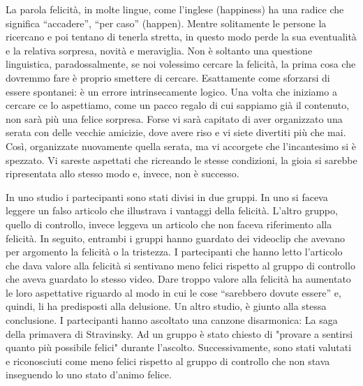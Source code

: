\documentclass[12pt]{book} %
\begin{document}
La parola felicità, in molte lingue, come l'inglese (happiness) ha una radice che significa
“accadere”, “per caso” (happen). Mentre solitamente le persone la ricercano e poi tentano di tenerla stretta, in questo
modo perde la sua eventualità e la relativa sorpresa, novità e meraviglia. Non è soltanto una questione linguistica,
paradossalmente, se noi volessimo cercare la felicità, la prima cosa che dovremmo fare è proprio smettere di cercare.
Esattamente come sforzarsi di essere spontanei: è un errore intrinsecamente logico. Una volta che iniziamo a cercare ce
lo aspettiamo, come un pacco regalo di cui sappiamo già il contenuto, non sarà più una felice sorpresa. Forse vi sarà
capitato di aver organizzato una serata con delle vecchie amicizie, dove avere riso e vi siete divertiti più che mai.
Così, organizzate nuovamente quella serata, ma vi accorgete che l'incantesimo si è spezzato. Vi
sareste aspettati che ricreando le stesse condizioni, la gioia si sarebbe ripresentata allo stesso modo e, invece, non
è successo. 

In uno studio i partecipanti sono stati divisi in
due gruppi. In uno si faceva leggere un falso articolo che illustrava i vantaggi della felicità.
L'altro gruppo, quello di controllo, invece leggeva un articolo che non faceva riferimento alla
felicità. In seguito, entrambi i gruppi hanno guardato dei videoclip che avevano per argomento la felicità o la
tristezza. I partecipanti che hanno letto l'articolo che dava valore alla felicità si sentivano
meno felici rispetto al gruppo di controllo che aveva guardato lo stesso video. Dare troppo valore alla felicità ha
aumentato le loro aspettative riguardo al modo in cui le cose “sarebbero dovute essere” e, quindi, li ha predisposti
alla delusione. Un altro
studio, è giunto alla stessa conclusione. I partecipanti hanno ascoltato una canzone disarmonica: La saga della primavera di
Stravinsky. Ad un gruppo è stato chiesto di "provare a sentirsi quanto più possibile
felici" durante l'ascolto. Successivamente, sono stati valutati e
riconosciuti come meno felici rispetto al gruppo di controllo che non stava inseguendo lo uno stato
d'animo felice. 
\end{document}
